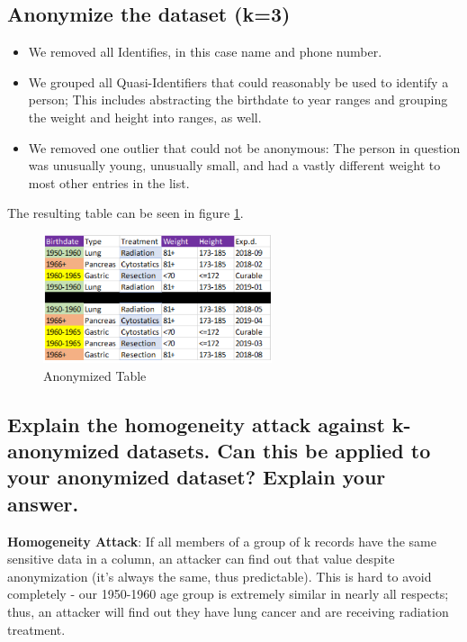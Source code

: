 \subsection{Anonymize the dataset (k=3)}
\begin{itemize}
\item We removed all Identifies, in this case name and phone number. 
\item We grouped all Quasi-Identifiers that could reasonably be used to
identify a person; This includes abstracting the birthdate to year
ranges and grouping the weight and height into ranges, as well. 
\item We removed one outlier that could not be anonymous: The person in
question was unusually young, unusually small, and had a vastly different
weight to most other entries in the list. 
\end{itemize}

The resulting table can be seen in figure \ref{img:ano_table}.

\begin{figure}[H]
	\centering
	\includegraphics[width=0.6\textwidth]{Assignment0x07/image/anonimyzed_table}
	
	\caption{Anonymized Table}
	\label{img:ano_table}
\end{figure}

\subsection{Explain the homogeneity attack against k-anonymized datasets. Can this be applied to your anonymized dataset? Explain your answer.}

\textbf{Homogeneity Attack}: If all members of a group of k records have the same sensitive data in a column, an attacker can find out that value despite anonymization (it’s always the same, thus predictable). This is hard to avoid completely - our 1950-1960 age group is extremely similar in nearly all respects; thus, an attacker will find out they have lung cancer and are receiving radiation treatment. 
